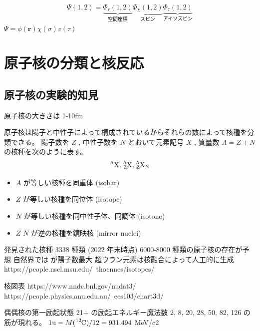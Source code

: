 \documentclass[uplatex,dvipdfmx,a4paper,11pt]{jlreq}
\newcommand{\rr}{\bm{r}}
\numberwithin{equation}{section}
\theoremstyle{definition}
\begin{document}
\begin{align}
  \Psi(1, 2) = \underbrace{\Phi_r(1, 2)}_{空間座標}\underbrace{\Phi_\chi(1, 2)}_{スピン}\underbrace{\Phi_\tau(1, 2)}_{アイソスピン}
\end{align}
$\Psi = \phi(\rr)\chi(\sigma)v(\tau)$


\section{原子核の分類と核反応}
\subsection{原子核の実験的知見}
原子核の大きさは 1-10fm

原子核は陽子と中性子によって構成されているからそれらの数によって核種を分類できる。
陽子数を $Z$ , 中性子数を $N$ とおいて元素記号 $X$ , 質量数 $A = Z + N$ の核種を次のように表す。
\begin{align}
  \ce{^AX}, \ce{^A_ZX}, \ce{^A_ZX_N}
\end{align}
\begin{itemize}
  \item $A$ が等しい核種を同重体 (isobar)
  \item $Z$ が等しい核種を同位体 (isotope)
  \item $N$ が等しい核種を同中性子体、同調体 (isotone)
  \item $Z$ $N$ が逆の核種を鏡映核 (mirror nuclei)
\end{itemize}

発見された核種 3338 種類 (2022 年末時点)
6000-8000 種類の原子核の存在が予想
自然界では  が陽子数最大
超ウラン元素は核融合によって人工的に生成
https://people.nscl.msu.edu/~thoennes/isotopes/

核図表
https://www.nndc.bnl.gov/nudat3/
https://people.physics.anu.edu.au/~ecs103/chart3d/

偶偶核の第一励起状態 21+ の励起エネルギー魔法数 2, 8, 20, 28, 50, 82, 126 の筋が現れる。
$1 \si{u} = M(\ce{^12C})/12 = 931.494$ \si{MeV/c2}
\end{document}
